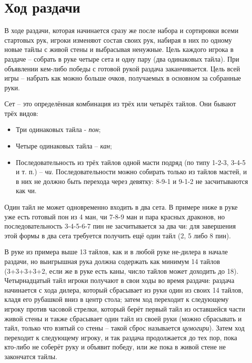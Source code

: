 \section{Ход раздачи}

В ходе раздачи, которая начинается сразу же после набора и сортировки всеми стартовых рук, игроки изменяют состав своих рук, набирая в них по одному новые тайлы с живой стены и выбрасывая ненужные. Цель каждого игрока в раздаче – собрать в руке четыре сета и одну пару (два одинаковых тайла). При объявлении кем-либо победы с готовой рукой раздача заканчивается. Цель всей игры – набрать как можно больше очков, получаемых в основном за собранные руки.

Сет – это определённая комбинация из трёх или четырёх тайлов. Они бывают трёх видов:
\begin{itemize}
	\item Три одинаковых тайла - \textit{пон};
	\item Четыре одинаковых тайла – \textit{кан};
	\item Последовательность из трёх тайлов одной масти подряд (по типу 1-2-3, 3-4-5 и т. п.) – \textit{чи}. Последовательности можно собирать только из тайлов мастей, и в них не должно быть перехода через девятку: 8-9-1 и 9-1-2 не засчитываются как чи.
\end{itemize}

Один тайл не может одновременно входить в два сета. В примере ниже в руке уже есть готовый пон из 4 ман, чи 7-8-9 ман и пара красных драконов, но последовательность 3-4-5-6-7 пин не засчитывается за два чи: для завершения этой формы в два сета требуется получить ещё один тайл (2, 5 либо 8 пин).


В руке из примера выше 13 тайлов, как и в любой руке не-дилера в начале раздачи, но выигрышная рука должна содержать как минимум 14 тайлов (3+3+3+3+2, если же в руке есть каны, число тайлов может доходить до 18). Четырнадцатый тайл игроки получают в свои ходы во время раздачи: раздача начинается с хода дилера, который сбрасывает из руки один из своих 14 тайлов, кладя его рубашкой вниз в центр стола; затем ход переходит к следующему игроку против часовой стрелки, который берёт первый тайл из оставшейся части живой стены и также сбрасывает один тайл из своей руки (можно сбрасывать и тайл, только что взятый со стены – такой сброс называется \textit{цумогири}). Затем ход переходит к следующему игроку, и так раздача продолжается до тех пор, пока кто-либо не соберёт руку и объявит победу, или же пока в живой стене не закончатся тайлы. 

